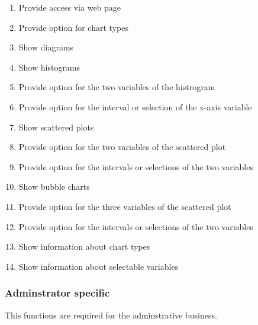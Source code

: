 \begin{enumerate}
  \item Provide access via web page
    
  \item Provide option for chart types
  
  \item Show diagrams
  
  \item Show histograms %
  
  \item Provide option for the two variables of the histrogram
  
  \item Provide option for the interval or selection of the x-axis variable %
  
  \item Show scattered plots %
  
  \item Provide option for the two variables of the scattered plot
  
  \item Provide option for the intervals or selections of the two variables %
  
  
  
  \item Show bubble charts %
  
  \item Provide option for the three variables of the scattered plot
  
  \item Provide option for the intervals or selections of the two variables %
  
  \item Show information about chart types
  
  \item Show information about selectable variables
  
\end{enumerate}


\subsubsection*{Adminstrator specific}
This functions are required for the adminstrative business.

